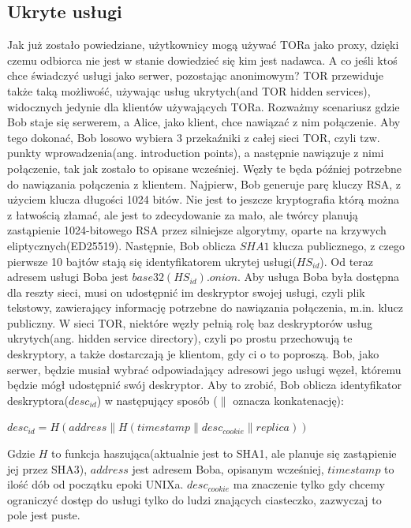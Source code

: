 \documentclass[polish]{kbk}
\begin{document}
\subsection{Ukryte usługi}
Jak już zostało powiedziane, użytkownicy mogą używać TORa jako proxy, dzięki czemu
odbiorca nie jest w stanie dowiedzieć się kim jest nadawca. A co jeśli ktoś chce
świadczyć usługi jako serwer, pozostając anonimowym? TOR przewiduje także taką możliwość,
używając usług ukrytych(and TOR hidden services), widocznych jedynie dla klientów 
używających TORa. Rozważmy scenariusz gdzie Bob staje się serwerem, a Alice, jako 
klient, chce nawiązać z nim połączenie. Aby tego dokonać\cite{deanonymisation}, 
Bob losowo wybiera 3 przekaźniki z całej sieci TOR, czyli tzw. punkty wprowadzenia(ang. 
introduction points), a następnie nawiązuje z nimi połączenie, tak jak zostało to 
opisane wcześniej. Węzły te będa później potrzebne  do nawiązania połączenia z klientem.
Najpierw, Bob generuje parę kluczy RSA, z użyciem klucza długości 1024 bitów. Nie jest
to jeszcze kryptografia którą można z łatwością złamać, ale jest to zdecydowanie za mało,
ale twórcy planują\cite{tortalk} zastąpienie 1024-bitowego RSA przez silniejsze 
algorytmy, oparte na krzywych eliptycznych(ED25519).
Następnie, Bob oblicza $SHA1$ klucza publicznego, z czego pierwsze 10 bajtów stają się 
identyfikatorem ukrytej usługi($HS_{id}$). 
Od teraz adresem usługi Boba jest $base32(HS_{id}).onion$. Aby usługa Boba była dostępna 
dla reszty sieci, musi on udostępnić im deskryptor swojej usługi, czyli plik tekstowy,
zawierający informację potrzebne do nawiązania połączenia, m.in. klucz publiczny. 
W sieci TOR, niektóre węzły pełnią rolę baz deskryptorów usług ukrytych(ang. hidden service 
directory), czyli po prostu przechowują te deskryptory, a także 
dostarczają je klientom, gdy ci o to poproszą. Bob, jako serwer, będzie musiał wybrać 
odpowiadający adresowi jego usługi węzeł, któremu będzie mógł udostępnić swój deskryptor. 
Aby to zrobić, Bob oblicza identyfikator deskryptora($desc_{id}$) w następujący sposób
($\|$ oznacza konkatenację):
\begin{center}
$desc_{id} = H(address \| H(timestamp \| desc_{cookie} \| replica))$
\end{center}
Gdzie $H$ to funkcja haszująca(aktualnie jest to SHA1, ale planuje się\cite{tortalk}
zastąpienie jej przez SHA3),
$address$ jest adresem Boba, opisanym wcześniej, $timestamp$ to ilość dób od 
początku epoki UNIXa. $desc_{cookie}$ ma znaczenie tylko gdy chcemy ograniczyć dostęp 
do usługi tylko do ludzi znających ciasteczko, zazwyczaj to pole jest puste.
\end{document}
